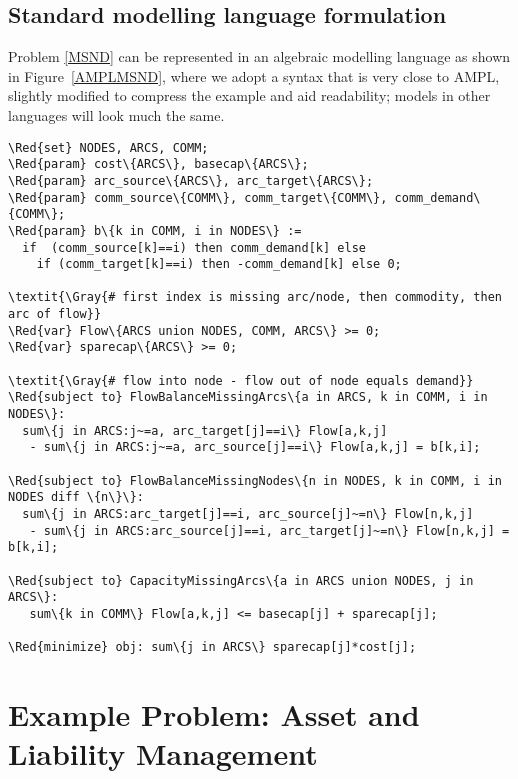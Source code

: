 \documentclass[10pt,a4paper]{book}
\begin{document}
%
%
\subsection{Standard modelling language formulation}

Problem \eqref{MSND} can be represented in an algebraic
modelling language as shown in Figure~\ref{AMPLMSND}, where we adopt a
syntax that is very close to AMPL, slightly modified to compress the example
and aid readability; models in other languages will look much the same.
%
\begin{Verbatim}[frame=single,framerule=0.2pt,framesep=5pt,commandchars=\\\{\}]
\Red{set} NODES, ARCS, COMM;
\Red{param} cost\{ARCS\}, basecap\{ARCS\};
\Red{param} arc_source\{ARCS\}, arc_target\{ARCS\};
\Red{param} comm_source\{COMM\}, comm_target\{COMM\}, comm_demand\{COMM\};
\Red{param} b\{k in COMM, i in NODES\} := 
  if  (comm_source[k]==i) then comm_demand[k] else 
    if (comm_target[k]==i) then -comm_demand[k] else 0;

\textit{\Gray{# first index is missing arc/node, then commodity, then arc of flow}}
\Red{var} Flow\{ARCS union NODES, COMM, ARCS\} >= 0;
\Red{var} sparecap\{ARCS\} >= 0;
 
\textit{\Gray{# flow into node - flow out of node equals demand}}
\Red{subject to} FlowBalanceMissingArcs\{a in ARCS, k in COMM, i in NODES\}:
  sum\{j in ARCS:j~=a, arc_target[j]==i\} Flow[a,k,j]  
   - sum\{j in ARCS:j~=a, arc_source[j]==i\} Flow[a,k,j] = b[k,i]; 

\Red{subject to} FlowBalanceMissingNodes\{n in NODES, k in COMM, i in NODES diff \{n\}\}:
  sum\{j in ARCS:arc_target[j]==i, arc_source[j]~=n\} Flow[n,k,j]  
   - sum\{j in ARCS:arc_source[j]==i, arc_target[j]~=n\} Flow[n,k,j] = b[k,i]; 

\Red{subject to} CapacityMissingArcs\{a in ARCS union NODES, j in ARCS\}:
   sum\{k in COMM\} Flow[a,k,j] <= basecap[j] + sparecap[j];

\Red{minimize} obj: sum\{j in ARCS\} sparecap[j]*cost[j];
\end{Verbatim}

\section{Example Problem: Asset and Liability Management}
\end{document}
